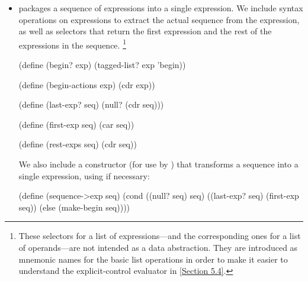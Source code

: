 \begin{itemize}[leftmargin=*]
		\begin{scheme}
		  (define (if? exp) (tagged-list? exp 'if))

		  (define (if-predicate exp) (cadr exp))

		  (define (if-consequent exp) (caddr exp))

		  (define (if-alternative exp)
		    (if (not (null? (cdddr exp)))
		        (cadddr exp)
		        'false))
		\end{scheme}

		We also provide a constructor for  expressions, to be used by  to transform  expressions into  expressions:

		\begin{scheme}
		  (define (make-if predicate consequent alternative)
		    (list 'if predicate consequent alternative))
		\end{scheme}

	\item
		 packages a sequence of expressions into a single expression.
		We include syntax operations on  expressions to extract the actual sequence from the  expression, as well as selectors that return the first expression and the rest of the expressions in the sequence.%
		\footnote{
			These selectors for a list of expressions---and the corresponding ones for a list of operands---are not intended as a data abstraction.
			They are introduced as mnemonic names for the basic list operations in order to make it easier to understand the explicit-control evaluator in \cref{Section 5.4}.
		}

		\begin{scheme}
		  (define (begin? exp) (tagged-list? exp 'begin))

		  (define (begin-actions exp) (cdr exp))

		  (define (last-exp? seq) (null? (cdr seq)))

		  (define (first-exp seq) (car seq))

		  (define (rest-exps seq) (cdr seq))
		\end{scheme}

		We also include a constructor  (for use by ) that transforms a sequence into a single expression, using  if necessary:

		\begin{scheme}
		  (define (sequence->exp seq)
		    (cond ((null? seq) seq)
		          ((last-exp? seq) (first-exp seq))
		          (else (make-begin seq))))


\end{scheme}
\end{itemize}
